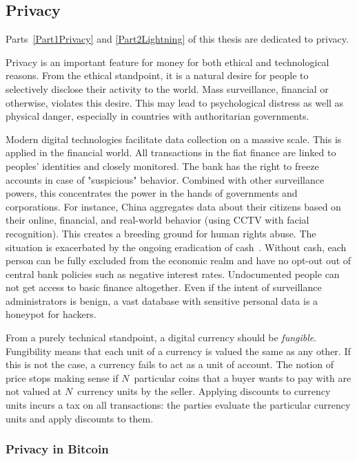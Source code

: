 \subsection{Privacy}

Parts~\ref{Part1Privacy} and \ref{Part2Lightning} of this thesis are dedicated to privacy.

Privacy is an important feature for money for both ethical and technological reasons.
From the ethical standpoint, it is a natural desire for people to selectively disclose their activity to the world.
Mass surveillance, financial or otherwise, violates this desire.
This may lead to psychological distress as well as physical danger, especially in countries with authoritarian governments.

Modern digital technologies facilitate data collection on a massive scale.
This is applied in the financial world.
All transactions in the fiat finance are linked to peoples' identities and closely monitored.
The bank has the right to freeze accounts in case of "suspicious" behavior.
Combined with other surveillance powers, this concentrates the power in the hands of governments and corporations.
For instance, China aggregates data about their citizens based on their online, financial, and real-world behavior (using CCTV with facial recognition).
This creates a breeding ground for human rights abuse.
The situation is exacerbated by the ongoing eradication of cash~\cite{Brito2019}.
Without cash, each person can be fully excluded from the economic realm and have no opt-out out of central bank policies such as negative interest rates.
Undocumented people can not get access to basic finance altogether.
Even if the intent of surveillance administrators is benign, a vast database with sensitive personal data is a honeypot for hackers.

From a purely technical standpoint, a digital currency should be \textit{fungible}.
Fungibility means that each unit of a currency is valued the same as any other.
If this is not the case, a currency fails to act as a unit of account.
The notion of price stops making sense if $N$~particular coins that a buyer wants to pay with are not valued at $N$~currency units by the seller.
Applying discounts to currency units incurs a tax on all transactions: the parties evaluate the particular currency units and apply discounts to them.


\subsubsection*{Privacy in Bitcoin}

